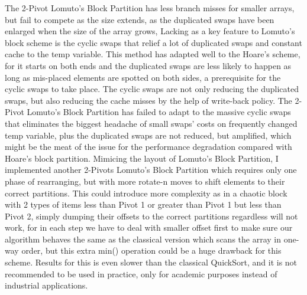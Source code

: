 \documentclass{article}
\begin{document}
The 2-Pivot Lomuto's Block Partition has less branch misses for smaller arrays, but fail to compete as the size extends, as the duplicated swaps have been enlarged when the size of the array grows, 
Lacking as a key feature to Lomuto's block scheme is the cyclic swaps that relief a lot of duplicated swaps and constant cache to the temp variable. This method has adapted well to the Hoare's scheme, for it starts on both ends and the duplicated swaps are less likely to happen as long as mis-placed elements are spotted on both sides, a prerequisite for the cyclic swaps to take place.
The cyclic swaps are not only reducing the duplicated swaps, but also reducing the cache misses by the help of write-back policy. The 2-Pivot Lomuto's Block Partition has failed to adapt to the massive cyclic swaps that eliminates the biggest headache of small swaps' costs on frequently changed temp variable, plus the duplicated swaps are not reduced, but amplified, which might be the meat of the issue for the performance degradation compared with Hoare's block partition. %
Mimicing the layout of Lomuto's Block Partition, I implemented another 2-Pivots Lomuto's Block Partition which requires only one phase of rearranging, but with more rotate-n moves to shift elements to their correct partitions. This could introduce more complexity as in a chaotic block with 2 types of items less than Pivot 1 or greater than Pivot 1 but less than Pivot 2,
simply dumping their offsets to the correct partitions regardless will not work, for in each step we have to deal with smaller offset first to make sure our algorithm behaves the same as the classical version which scans the array in one-way order, but this extra min() operation could be a huge drawback for this scheme.
Results for this is even slower than the classical QuickSort, and it is not recommended to be used in practice, only for academic purposes instead of industrial applications.
\end{document}
